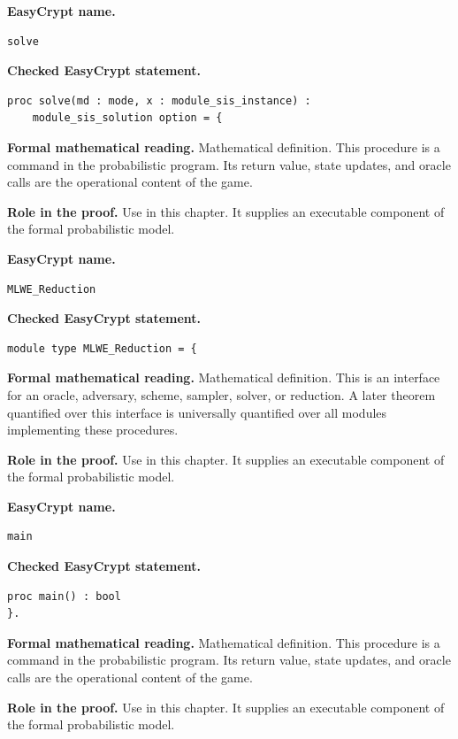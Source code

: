 \begin{formaldefinition}
\noindent\textbf{EasyCrypt name.}
\begin{lstlisting}[language=EasyCrypt,basicstyle=\ttfamily\scriptsize]
solve
\end{lstlisting}
\noindent\textbf{Checked EasyCrypt statement.}
\begin{lstlisting}[language=EasyCrypt,basicstyle=\ttfamily\scriptsize]
proc solve(md : mode, x : module_sis_instance) :
    module_sis_solution option = {
\end{lstlisting}
\noindent\textbf{Formal mathematical reading.}
Mathematical definition. This procedure is a command in the probabilistic program.  Its return value, state updates, and oracle calls are the operational content of the game.

\noindent\textbf{Role in the proof.}
Use in this chapter. It supplies an executable component of the formal probabilistic model.

\end{formaldefinition}

\begin{formaldefinition}
\noindent\textbf{EasyCrypt name.}
\begin{lstlisting}[language=EasyCrypt,basicstyle=\ttfamily\scriptsize]
MLWE_Reduction
\end{lstlisting}
\noindent\textbf{Checked EasyCrypt statement.}
\begin{lstlisting}[language=EasyCrypt,basicstyle=\ttfamily\scriptsize]
module type MLWE_Reduction = {
\end{lstlisting}
\noindent\textbf{Formal mathematical reading.}
Mathematical definition. This is an interface for an oracle, adversary, scheme, sampler, solver, or reduction.  A later theorem quantified over this interface is universally quantified over all modules implementing these procedures.

\noindent\textbf{Role in the proof.}
Use in this chapter. It supplies an executable component of the formal probabilistic model.

\end{formaldefinition}

\begin{formaldefinition}
\noindent\textbf{EasyCrypt name.}
\begin{lstlisting}[language=EasyCrypt,basicstyle=\ttfamily\scriptsize]
main
\end{lstlisting}
\noindent\textbf{Checked EasyCrypt statement.}
\begin{lstlisting}[language=EasyCrypt,basicstyle=\ttfamily\scriptsize]
proc main() : bool
}.
\end{lstlisting}
\noindent\textbf{Formal mathematical reading.}
Mathematical definition. This procedure is a command in the probabilistic program.  Its return value, state updates, and oracle calls are the operational content of the game.

\noindent\textbf{Role in the proof.}
Use in this chapter. It supplies an executable component of the formal probabilistic model.

\end{formaldefinition}


